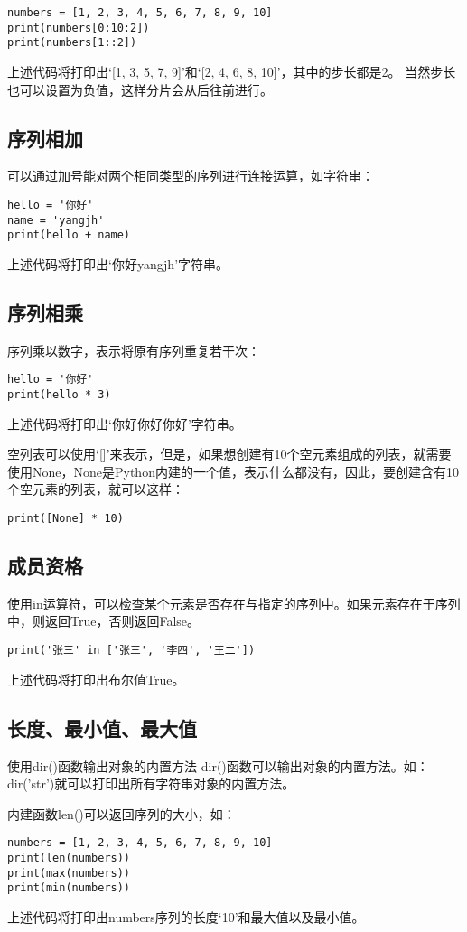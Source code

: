 \begin{lstlisting}
numbers = [1, 2, 3, 4, 5, 6, 7, 8, 9, 10]
print(numbers[0:10:2])
print(numbers[1::2])
\end{lstlisting}

上述代码将打印出‘[1, 3, 5, 7, 9]’和‘[2, 4, 6, 8, 10]’，其中的步长都是2。
当然步长也可以设置为负值，这样分片会从后往前进行。

\subsection{序列相加}
可以通过加号能对两个相同类型的序列进行连接运算，如字符串：

\begin{lstlisting}
hello = '你好'
name = 'yangjh'
print(hello + name)
\end{lstlisting}

上述代码将打印出‘你好yangjh’字符串。

\subsection{序列相乘}
序列乘以数字，表示将原有序列重复若干次：

\begin{lstlisting}
hello = '你好'
print(hello * 3)
\end{lstlisting}

上述代码将打印出‘你好你好你好’字符串。

空列表可以使用‘[]’来表示，但是，如果想创建有10个空元素组成的列表，就需要使用None，None是Python内建的一个值，表示什么都没有，因此，要创建含有10个空元素的列表，就可以这样：

\begin{lstlisting}
print([None] * 10)
\end{lstlisting}

\subsection{成员资格}
使用in运算符，可以检查某个元素是否存在与指定的序列中。如果元素存在于序列中，则返回True，否则返回False。

\begin{lstlisting}
print('张三' in ['张三', '李四', '王二'])
\end{lstlisting}

上述代码将打印出布尔值True。

\subsection{长度、最小值、最大值}

\begin{myremark}{使用dir()函数输出对象的内置方法}
dir()函数可以输出对象的内置方法。如：dir('str')就可以打印出所有字符串对象的内置方法。
\end{myremark}

内建函数len()可以返回序列的大小，如：

\begin{lstlisting}
numbers = [1, 2, 3, 4, 5, 6, 7, 8, 9, 10]
print(len(numbers))
print(max(numbers))
print(min(numbers))
\end{lstlisting}
上述代码将打印出numbers序列的长度‘10’和最大值以及最小值。
